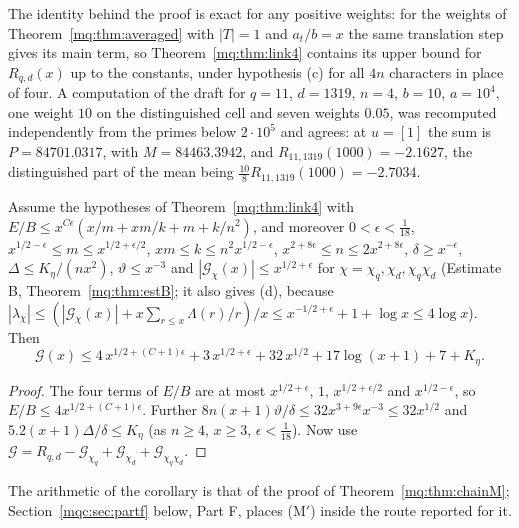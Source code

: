 The identity behind the proof is exact for any positive weights: for the weights of Theorem~\ref{mq:thm:averaged} with $|T|=1$ and $a_t/b=x$ the same translation step gives its main term, so Theorem~\ref{mq:thm:link4} contains its upper bound for $R_{q,d}(x)$ up to the constants, under hypothesis (c) for all $4n$ characters in place of four. A computation of the draft for $q=11$, $d=1319$, $n=4$, $b=10$, $a=10^4$, one weight $10$ on the distinguished cell and seven weights $0.05$, was recomputed independently from the primes below $2\cdot10^5$ and agrees: at $u=[1]$ the sum is $P=84701.0317$, with $M=84463.3942$, and $R_{11,1319}(1000)=-2.1627$, the distinguished part of the mean being $\frac{10}{8}R_{11,1319}(1000)=-2.7034$.

\begin{corollary}\label{mq:cor:link4}
Assume the hypotheses of Theorem~\ref{mq:thm:link4} with $E/B\le x^{C\epsilon}(x/m+xm/k+m+k/n^2)$, and moreover $0<\epsilon<\frac1{18}$, $x^{1/2-\epsilon}\le m\le x^{1/2+\epsilon/2}$, $xm\le k\le n^2x^{1/2-\epsilon}$, $x^{2+8\epsilon}\le n\le2x^{2+8\epsilon}$, $\delta\ge x^{-\epsilon}$, $\Delta\le K_\eta/(nx^2)$, $\vartheta\le x^{-3}$ and $|\mathcal G_\chi(x)|\le x^{1/2+\epsilon}$ for $\chi=\chi_q,\chi_d,\chi_q\chi_d$ (Estimate B, Theorem~\ref{mq:thm:estB}; it also gives (d), because $|\lambda_\chi|\le(|\mathcal G_\chi(x)|+x\sum_{r\le x}\Lambda(r)/r)/x\le x^{-1/2+\epsilon}+1+\log x\le4\log x$). Then
\[
\mathcal G(x)\le4\,x^{1/2+(C+1)\epsilon}+3\,x^{1/2+\epsilon}+32\,x^{1/2}+17\log(x+1)+7+K_\eta .
\]
\end{corollary}

\begin{proof}
The four terms of $E/B$ are at most $x^{1/2+\epsilon}$, $1$, $x^{1/2+\epsilon/2}$ and $x^{1/2-\epsilon}$, so $E/B\le4x^{1/2+(C+1)\epsilon}$. Further $8n(x+1)\vartheta/\delta\le32x^{3+9\epsilon}x^{-3}\le32x^{1/2}$ and $5.2(x+1)\Delta/\delta\le K_\eta$ (as $n\ge4$, $x\ge3$, $\epsilon<\frac1{18}$). Now use $\mathcal G=R_{q,d}-\mathcal G_{\chi_q}+\mathcal G_{\chi_d}+\mathcal G_{\chi_q\chi_d}$.
\end{proof}

The arithmetic of the corollary is that of the proof of Theorem~\ref{mq:thm:chainM}; Section~\ref{mqc:sec:partf} below, Part F, places (M$'$) inside the route reported for it.

